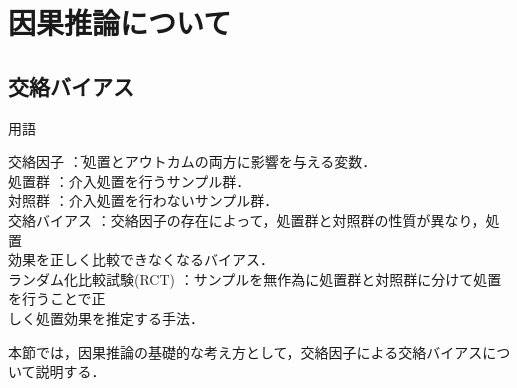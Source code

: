 \documentclass[dvipdfmx]{jreport}
\begin{document}
\section{因果推論について}
\subsection{交絡バイアス}
\begin{itembox}[l]{\large{用語}}
    \begin{tabbing}
        \hspace{15pt} \raisebox{0.5ex}{\tiny $\bullet$} 交絡因子 \hspace{80pt}\=：処置とアウトカムの両方に影響を与える変数．\\[0.5em]
        \hspace{15pt} \raisebox{0.5ex}{\tiny $\bullet$} 処置群 \>：介入処置を行うサンプル群．\\[0.5em]
        \hspace{15pt} \raisebox{0.5ex}{\tiny $\bullet$} 対照群 \>：介入処置を行わないサンプル群．\\[0.5em]
        \hspace{15pt} \raisebox{0.5ex}{\tiny $\bullet$} 交絡バイアス \>：交絡因子の存在によって，処置群と対照群の性質が異なり，処置\\[0.5em]\>\hspace{6.5pt}効果を正しく比較できなくなるバイアス．\\[0.5em] 
        \hspace{15pt} \raisebox{0.5ex}{\tiny $\bullet$} ランダム化比較試験(RCT) \>：サンプルを無作為に処置群と対照群に分けて処置を行うことで正\\[0.5em]\>\hspace{6.5pt}しく処置効果を推定する手法．
    \end{tabbing}
\end{itembox}

本節では，因果推論の基礎的な考え方として，交絡因子による交絡バイアスについて説明する．
\end{document}
